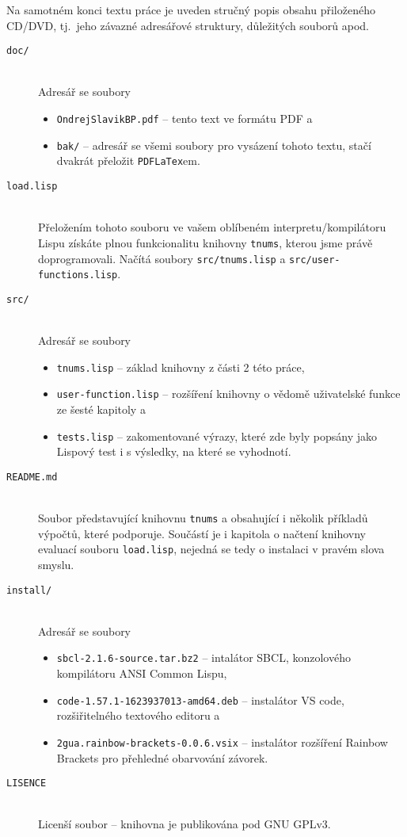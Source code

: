 Na samotném konci textu práce je uveden stručný popis obsahu
přiloženého CD/DVD, tj.~jeho závazné adresářové struktury, důležitých
souborů apod.

\begin{description}
\item[\texttt{doc/}] \hfill \\
Adresář se soubory
\begin{itemize}
\item{\texttt{OndrejSlavikBP.pdf} -- tento text ve formátu PDF a}
\item{\texttt{bak/} -- adresář se všemi soubory pro vysázení tohoto textu, stačí dvakrát přeložit \texttt{PDFLaTex}em.}
\end{itemize}

\item[\texttt{load.lisp}] \hfill \\
Přeložením tohoto souboru ve vašem oblíbeném interpretu/kompilátoru Lispu získáte plnou funkcionalitu knihovny \texttt{tnums}, kterou jsme právě doprogramovali. Načítá soubory \texttt{src/tnums.lisp} a \texttt{src/user-functions.lisp}.

\item[\texttt{src/}] \hfill \\
Adresář se soubory
\begin{itemize}
\item{\texttt{tnums.lisp} -- základ knihovny z části 2 této práce,}
\item{\texttt{user-function.lisp} -- rozšíření knihovny o vědomě uživatelské funkce ze šesté kapitoly a}
\item{\texttt{tests.lisp} -- zakomentované výrazy, které zde byly popsány jako Lispový test i s výsledky, na které se vyhodnotí.}
\end{itemize}

\item[\texttt{README.md}] \hfill \\
Soubor představující knihovnu \texttt{tnums} a obsahující i několik příkladů výpočtů, které podporuje. Součástí je i kapitola o načtení knihovny evaluací souboru \texttt{load.lisp}, nejedná se tedy o instalaci v pravém slova smyslu.

\item[\texttt{install/}] \hfill \\
Adresář se soubory
\begin{itemize}
\item{\texttt{sbcl-2.1.6-source.tar.bz2} -- intalátor SBCL, konzolového kompilátoru ANSI Common Lispu,}
\item{\texttt{code-1.57.1-1623937013-amd64.deb} -- instalátor VS code, rozšiřitelného textového editoru a}
\item{\texttt{2gua.rainbow-brackets-0.0.6.vsix} -- instalátor rozšíření Rainbow Brackets pro přehledné obarvování závorek.}
\end{itemize}

\item[\texttt{LISENCE}] \hfill \\
Licenší soubor -- knihovna je publikována pod GNU GPLv3.
\end{description}
